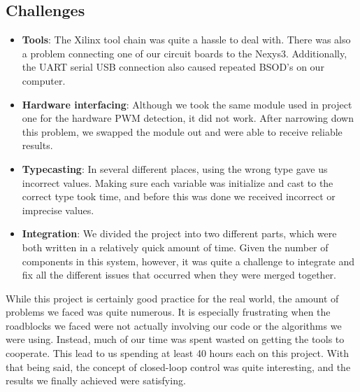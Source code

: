 \documentclass[11pt]{article}
\begin{document}
	
	\subsection{Challenges}
		
		\begin{itemize}				
		\item \textbf{Tools}: The Xilinx tool chain was quite a hassle to deal with.  There was also a problem connecting one of our circuit boards to the Nexys3.  Additionally, the UART serial USB connection also caused repeated BSOD's on our computer.
		\item \textbf{Hardware interfacing}: Although we took the same module used in project one for the hardware PWM detection, it did not work.  After narrowing down this problem, we swapped the module out and were able to receive reliable results.
		\item \textbf{Typecasting}: In several different places, using the wrong type gave us incorrect values.  Making sure each variable was initialize and cast to the correct type took time, and before this was done we received incorrect or imprecise values.
		\item \textbf{Integration}: We divided the project into two different parts, which were both written in a relatively quick amount of time.  Given the number of components in this system, however, it was quite a challenge to integrate and fix all the different issues that occurred when they were merged together. 
		\end{itemize}

While this project is certainly good practice for the real world, the amount of problems we faced was quite numerous.  It is especially frustrating when the roadblocks we faced were not actually involving our code or the algorithms we were using.  Instead, much of our time was spent wasted on getting the tools to cooperate.  This lead to us spending at least 40 hours each on this project.  With that being said, the concept of closed-loop control was quite interesting, and the results we finally achieved were satisfying. 
	
\end{document}
